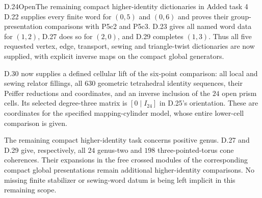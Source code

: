 \begin{result}{D.24}{Open}{The remaining compact higher-identity dictionaries in Added task 4}
D.22 supplies every finite word for $(0,5)$ and $(0,6)$
and proves their group-presentation comparisons with
P5c2 and P5c3.  D.23 gives all named word data for
$(1,2)$, D.27 does so for $(2,0)$, and D.29 completes
$(1,3)$.  Thus all five requested vertex, edge,
transport, sewing and triangle-twist dictionaries
are now supplied, with explicit inverse maps on the
compact global generators.

D.30 now supplies a defined cellular lift of the
six-point comparison: all local and sewing relator
fillings, all $630$ geometric tetrahedral identity
sequences, their Peiffer reductions and coordinates,
and an inverse inclusion of the $24$ open prism
cells.  Its selected degree-three matrix is
$[0\mid I_{24}]$ in D.25's orientation.  These are
coordinates for the specified mapping-cylinder
model, whose entire lower-cell comparison is given.

The remaining compact higher-identity task concerns
positive genus.  D.27 and D.29 give, respectively, all
$24$ genus-two and $198$ three-pointed-torus cone
coherences.  Their expansions in the free crossed
modules of the corresponding compact global
presentations remain additional higher-identity
comparisons.  No missing finite stabilizer or
sewing-word datum is being left implicit in this
remaining scope.
\end{result}

